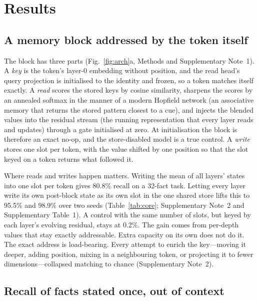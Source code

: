 \section*{Results}

\subsection*{A memory block addressed by the token itself}

The block has three parts (Fig.~\ref{fig:arch}a, Methods and Supplementary Note~1). A \emph{key} is the
token's layer-0 embedding without position, and the read head's query projection is
initialised to the identity and frozen, so a token matches itself exactly. A \emph{read} scores the stored
keys by cosine similarity, sharpens the scores by an annealed softmax in the manner of a modern Hopfield network\cite{hopfield1982,ramsauer2021hopfield} (an associative memory that returns the stored pattern closest to a cue), and injects the blended values into the residual stream (the running representation that every layer reads and updates) through a gate initialised at zero\cite{bachlechner2021rezero}.
At initialisation the block is therefore an exact no-op, and the store-disabled model is a
true control. A \emph{write} stores one slot per token, with the value shifted by one
position so that the slot keyed on a token returns what followed it.

Where reads and writes happen matters. Writing the mean of all layers' states into one slot
per token gives 80.8\% recall on a 32-fact task. Letting every layer write its own
post-block state as its own slot in the one shared store lifts this to 95.5\% and 98.9\% over two seeds (Table~\ref{tab:core}; Supplementary Note~2 and Supplementary Table~1). A control with the same
number of slots, but keyed by each layer's evolving residual, stays at
0.2\%. The gain comes from per-depth values that stay exactly addressable. Extra capacity
on its own does not do it. The exact address is load-bearing. Every attempt to enrich the
key---moving it deeper, adding position, mixing in a neighbouring token, or projecting it to
fewer dimensions---collapsed matching to chance (Supplementary Note~2).

\subsection*{Recall of facts stated once, out of context}


